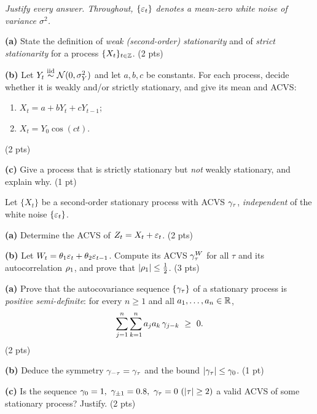 \documentclass[11pt]{article}
\begin{document}
\pointstable
\begin{center}\itshape Justify every answer. Throughout, $\{\varepsilon_t\}$ denotes a mean-zero white noise of variance $\sigma^2$.\end{center}

\textbf{(a)} State the definition of \emph{weak (second-order) stationarity} and of \emph{strict stationarity} for a process $\{X_t\}_{t\in\mathbb{Z}}$. \hfill(2 pts)

\textbf{(b)} Let $Y_t\overset{\text{iid}}{\sim}\mathcal N(0,\sigma_Y^2)$ and let $a,b,c$ be constants. For each process, decide whether it is weakly and/or strictly stationary, and give its mean and ACVS:
\begin{enumerate}[label=(\roman*)]
  \item $X_t = a + bY_t + cY_{t-1}$;
  \item $X_t = Y_0\cos(ct)$.
\end{enumerate}\hfill(2 pts)

\textbf{(c)} Give a process that is strictly stationary but \emph{not} weakly stationary, and explain why. \hfill(1 pt)
\answerpage

Let $\{X_t\}$ be a second-order stationary process with ACVS $\gamma_\tau$, \emph{independent} of the white noise $\{\varepsilon_t\}$.

\textbf{(a)} Determine the ACVS of $Z_t = X_t + \varepsilon_t$. \hfill(2 pts)

\textbf{(b)} Let $W_t = \theta_1\varepsilon_t + \theta_2\varepsilon_{t-1}$. Compute its ACVS $\gamma^W_\tau$ for all $\tau$ and its autocorrelation $\rho_1$, and prove that $\left\lvert \rho_1 \right\rvert\le\tfrac12$. \hfill(3 pts)
\answerpage

\textbf{(a)} Prove that the autocovariance sequence $\{\gamma_\tau\}$ of a stationary process is \emph{positive semi-definite}: for every $n\ge1$ and all $a_1,\dots,a_n\in\mathbb{R}$,
\[
\sum_{j=1}^{n}\sum_{k=1}^{n} a_j a_k\,\gamma_{j-k}\ \ge\ 0 .
\]\hfill(2 pts)

\textbf{(b)} Deduce the symmetry $\gamma_{-\tau}=\gamma_\tau$ and the bound $\left\lvert \gamma_\tau \right\rvert\le\gamma_0$. \hfill(1 pt)

\textbf{(c)} Is the sequence $\acvs_0 = 1,\ \acvs_{\pm1} = 0.8,\ \acvs_\tau = 0\ (\abs\tau\ge2)$ a valid ACVS of some stationary process? Justify. \hfill(2 pts)
\answerpage
\end{document}
